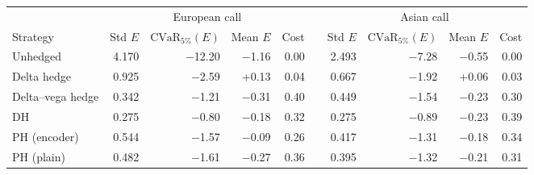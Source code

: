 \begin{tabular}{@{}l rrrr c rrrr@{}}
\toprule
 & \multicolumn{4}{c}{European call} && \multicolumn{4}{c}{Asian call} \\
\cmidrule{2-5}\cmidrule{7-10}
Strategy & Std $E$ & $\mathrm{CVaR}_{5\%}(E)$ & Mean $E$ & Cost && Std $E$ & $\mathrm{CVaR}_{5\%}(E)$ & Mean $E$ & Cost \\
\midrule
Unhedged & 4.170 & $-$12.20 & $-$1.16 & 0.00 && 2.493 & $-$7.28 & $-$0.55 & 0.00 \\
Delta hedge & 0.925 & $-$2.59 & +0.13 & 0.04 && 0.667 & $-$1.92 & +0.06 & 0.03 \\
Delta--vega hedge & 0.342 & $-$1.21 & $-$0.31 & 0.40 && 0.449 & $-$1.54 & $-$0.23 & 0.30 \\
\midrule
DH & 0.275 & $-$0.80 & $-$0.18 & 0.32 && 0.275 & $-$0.89 & $-$0.23 & 0.39 \\
PH (encoder) & 0.544 & $-$1.57 & $-$0.09 & 0.26 && 0.417 & $-$1.31 & $-$0.18 & 0.34 \\
PH (plain) & 0.482 & $-$1.61 & $-$0.27 & 0.36 && 0.395 & $-$1.32 & $-$0.21 & 0.31 \\
\bottomrule
\end{tabular}
